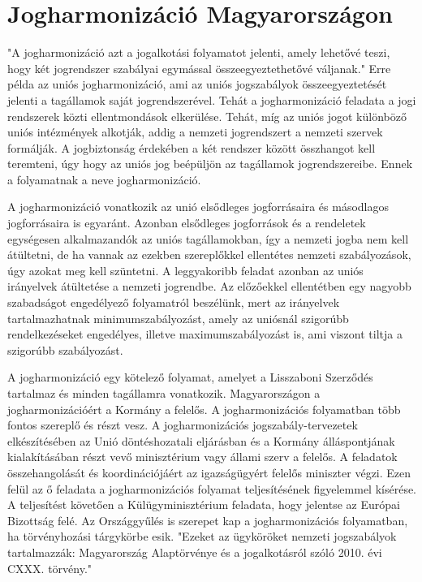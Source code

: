 \section{Jogharmonizáció Magyarországon} \label{jogharmonizacio}

"A jogharmonizáció azt a jogalkotási folyamatot jelenti, amely lehetővé teszi, hogy két jogrendszer szabályai egymással összeegyeztethetővé váljanak." \cite{jogharmonizacio} Erre példa az uniós jogharmonizáció, ami az uniós jogszabályok összeegyeztetését jelenti a tagállamok saját jogrendszerével. Tehát a jogharmonizáció feladata a jogi rendszerek közti ellentmondások elkerülése. Tehát, míg az uniós jogot különböző uniós intézmények alkotják, addig a nemzeti jogrendszert a nemzeti szervek formálják. A jogbiztonság érdekében a két rendszer között összhangot kell teremteni, úgy hogy az uniós jog beépüljön az tagállamok jogrendszereibe. Ennek a folyamatnak a neve jogharmonizáció.

A jogharmonizáció vonatkozik az unió elsődleges jogforrásaira és másodlagos jogforrásaira is egyaránt. Azonban elsődleges jogforrások és a rendeletek egységesen alkalmazandók az uniós tagállamokban, így a nemzeti jogba nem kell átültetni, de ha vannak az ezekben szereplőkkel ellentétes nemzeti szabályozások, úgy azokat meg kell szüntetni. A leggyakoribb feladat azonban az uniós irányelvek átültetése a nemzeti jogrendbe. Az előzőekkel ellentétben egy nagyobb szabadságot engedélyező folyamatról beszélünk, mert az irányelvek tartalmazhatnak minimumszabályozást, amely az uniósnál szigorúbb rendelkezéseket engedélyes, illetve maximumszabályozást is, ami viszont tiltja a szigorúbb szabályozást.

A jogharmonizáció egy kötelező folyamat, amelyet a Lisszaboni Szerződés tartalmaz és minden tagállamra vonatkozik. Magyarországon a jogharmonizációért a Kormány a felelős. A jogharmonizációs folyamatban több fontos szereplő és részt vesz. A jogharmonizációs jogszabály-tervezetek elkészítésében az Unió döntéshozatali eljárásban és a Kormány álláspontjának kialakításában részt vevő minisztérium vagy állami szerv a felelős. A feladatok összehangolását és koordinációjáért az igazságügyért felelős miniszter végzi. Ezen felül az ő feladata a jogharmonizációs folyamat teljesítésének figyelemmel kísérése. A teljesítést követően a Külügyminisztérium feladata, hogy jelentse az Európai Bizottság felé. Az Országgyűlés is szerepet kap a jogharmonizációs folyamatban, ha törvényhozási tárgykörbe esik. "Ezeket az ügyköröket nemzeti jogszabályok tartalmazzák: Magyarország Alaptörvénye és a jogalkotásról szóló 2010. évi CXXX. törvény." \cite{jogharmonizacio}